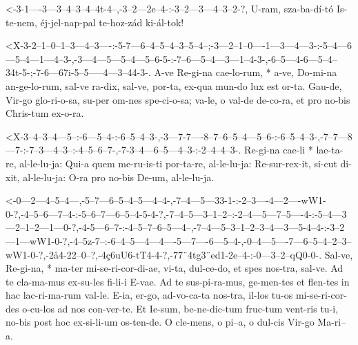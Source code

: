  {<-3-1----3---3--4--3--4--4t-4--,-3--2---2e--4-:-3--2---3---4--3--2-?,}
  {  U-ram, sza-ba-dí-tó Is-te-nem, éj-jel-nap-pal te-hoz-zád ki-ál-tok!}


  {<X-3-2--1--0--1--3---4--3----:-5-7---6--4--5--4--3--5--4--;-3---2--1--0----1---3---4---3-:-5--4---6---5--4---1---4--3-,-3---4---5---5--4---5--6-5-:-7--6---5--4---3---1--4-3-,-6--5---4-6---5--4--34t-5-;-7-6---67i-5--5-----4---3--44-3-.}
  {   A-ve Re-gi-na cae-lo-rum, * a-ve, Do-mi-na an-ge-lo-rum, sal-ve ra-dix, sal-ve, por-ta, ex-qua mun-do lux est or-ta. Gau-de, Vir-go glo-ri-o-sa, su-per om-nes spe-ci-o-sa; va-le, o val-de de-co-ra, et pro no-bis Chris-tum ex-o-ra.}


  {<X-3--4--3--4---5--:-6---5--4-:-6--5--4--3-,-3---7-7----8--7--6--5--4---5--6-:-6--5--4--3-,-7--7---8---7-:-7--3---4--3--:-4--5--6--7-,-7-3--4---6--5---4--3-:-2--4--4--3-.}
  {   Re-gi-na cae-li * lae-ta-re, al-le-lu-ja: Qui-a quem me-ru-is-ti por-ta-re, al-le-lu-ja: Re-sur-rex-it, si-cut di-xit, al-le-lu-ja: O-ra pro no-bis De-um, al-le-lu-ja.}


  {<-0---2---4--5--4---,-5--7---6--5--4--5---4--4-,-7--4---5---33-1-:-2--3----4---2----wW1-0-?,-4--5--6---7--4-:-5--6--7---6--5--4-5-4-?,-7--4--5---3--1--2--:-2--4---5---7--5----4-:-5--4---3---2--1--2---1---0-?,-4-5---6--7-:-4--5--7--6--5---4--,-7--4---5--3--1--2--3--4---3---5-4--4-:-3--2---1---wW1-0-?,-4--5z-7--:-6--4--5---4---4----5---7----6---5--4-,-0--4---5----7---6--5--4--2--3--wW1-0-?,-2å4-22--0--?,-4ç6uU6-tT4-4-?,-77¨4tg3¨ed1-2e--4-:-0---3--2--qQ0-0-.}
  {  Sal-ve, Re-gi-na, * ma-ter mi-se-ri-cor-di-ae, vi-ta, dul-ce-do, et spes nos-tra, sal-ve.  Ad te cla-ma-mus ex-su-les fi-li-i E-vae. Ad te sus-pi-ra-mus, ge-men-tes et flen-tes in hac lac-ri-ma-rum val-le.  E-ia, er-go, ad-vo-ca-ta nos-tra, il-los tu-os mi-se-ri-cor-des o-cu-los ad nos con-ver-te.  Et Ie-sum, be-ne-dic-tum fruc-tum vent-ris tu-i,  no-bis post hoc ex-si-li-um os-ten-de.  O   cle-mens, o      pi--a,   o           dul-cis Vir-go Ma-ri--a.}

